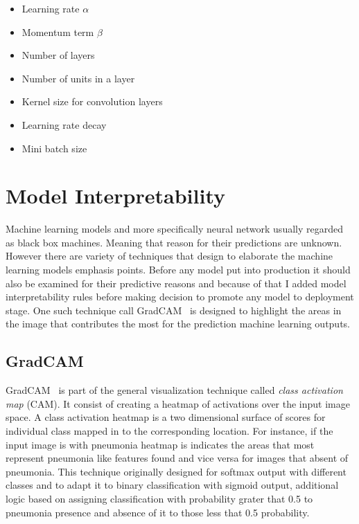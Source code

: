 \begin{itemize}
    \item Learning rate $\alpha$
    \item Momentum term $\beta$
    \item Number of layers
    \item Number of units in a layer
    \item Kernel size for convolution layers
    \item Learning rate decay
    \item Mini batch size
\end{itemize}

\section{Model Interpretability}
Machine learning models and more specifically neural network usually regarded as black box machines.
Meaning that reason for their predictions are unknown.
However there are variety of techniques that design to elaborate the machine learning models emphasis points.
Before any model put into production it should also be examined for their predictive reasons and because of that I added model interpretability rules before making decision to promote any model to deployment stage.
One such technique call GradCAM~\cite{heatmap} is designed to highlight the areas in the image that contributes the most for the prediction machine learning outputs.

\subsection{GradCAM}
GradCAM~\cite{heatmap} is part of the general visualization technique called \emph{class activation map} (CAM).
It consist of creating a heatmap of activations over the input image space.
A class activation heatmap is a two dimensional surface of scores for individual class mapped in to the corresponding location. For instance, if the input image is with pneumonia heatmap is indicates the areas that most represent pneumonia like features found and vice versa for images that absent of pneumonia.
This technique originally designed for softmax output with different classes and to adapt it to binary classification with sigmoid output, additional logic based on assigning classification with probability grater that 0.5 to pneumonia presence and absence of it to those less that 0.5 probability.

